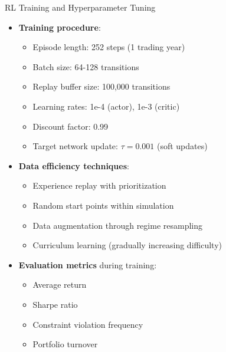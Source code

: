 \documentclass{beamer}
\begin{document}

\begin{frame}{RL Training and Hyperparameter Tuning}
\begin{itemize}
    \item \textbf{Training procedure}:
    \begin{itemize}
        \item Episode length: 252 steps (1 trading year)
        \item Batch size: 64-128 transitions
        \item Replay buffer size: 100,000 transitions
        \item Learning rates: 1e-4 (actor), 1e-3 (critic)
        \item Discount factor: 0.99
        \item Target network update: $\tau = 0.001$ (soft updates)
    \end{itemize}
    
    \item \textbf{Data efficiency techniques}:
    \begin{itemize}
        \item Experience replay with prioritization
        \item Random start points within simulation
        \item Data augmentation through regime resampling
        \item Curriculum learning (gradually increasing difficulty)
    \end{itemize}
    
    \item \textbf{Evaluation metrics} during training:
    \begin{itemize}
        \item Average return
        \item Sharpe ratio
        \item Constraint violation frequency
        \item Portfolio turnover
    \end{itemize}
\end{itemize}
\end{frame}
\end{document}
